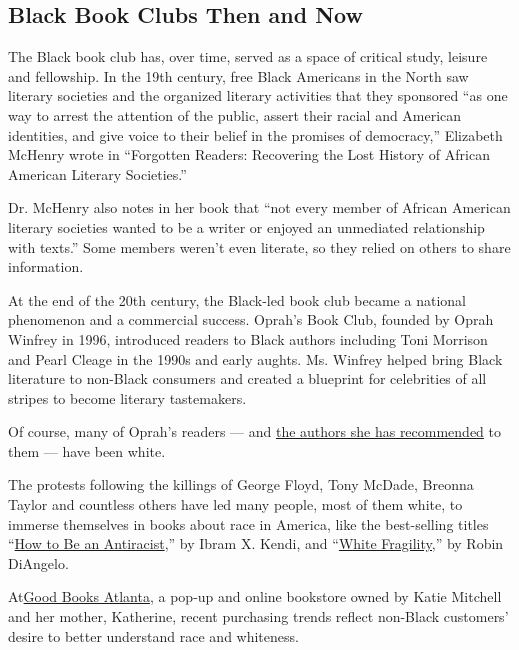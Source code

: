 \hypertarget{black-book-clubs-then-and-now}{%
\subsection{Black Book Clubs Then and
Now}\label{black-book-clubs-then-and-now}}

The Black book club has, over time, served as a space of critical study,
leisure and fellowship. In the 19th century, free Black Americans in the
North saw literary societies and the organized literary activities that
they sponsored ``as one way to arrest the attention of the public,
assert their racial and American identities, and give voice to their
belief in the promises of democracy,'' Elizabeth McHenry wrote in
``Forgotten Readers: Recovering the Lost History of African American
Literary Societies.''

Dr. McHenry also notes in her book that ``not every member of African
American literary societies wanted to be a writer or enjoyed an
unmediated relationship with texts.'' Some members weren't even
literate, so they relied on others to share information.

At the end of the 20th century, the Black-led book club became a
national phenomenon and a commercial success. Oprah's Book Club, founded
by Oprah Winfrey in 1996, introduced readers to Black authors including
Toni Morrison and Pearl Cleage in the 1990s and early aughts. Ms.
Winfrey helped bring Black literature to non-Black consumers and created
a blueprint for celebrities of all stripes to become literary
tastemakers.

Of course, many of Oprah's readers --- and
\href{https://www.oprahmag.com/entertainment/books/g23067476/oprah-book-club-list/}{the
authors she has recommended} to them --- have been white.

The protests following the killings of George Floyd, Tony McDade,
Breonna Taylor and countless others have led many people, most of them
white, to immerse themselves in books about race in America, like the
best-selling titles
``\href{https://bookshop.org/books/how-to-be-an-antiracist-9780593396803/9780593396803}{How
to Be an Antiracist},'' by Ibram X. Kendi, and
``\href{https://www.nytimes3xbfgragh.onion/2020/07/15/magazine/white-fragility-robin-diangelo.html}{White
Fragility,}'' by Robin DiAngelo.

At\href{https://www.goodbooksatl.com/}{Good Books Atlanta}, a pop-up and
online bookstore owned by Katie Mitchell and her mother, Katherine,
recent purchasing trends reflect non-Black customers' desire to better
understand race and whiteness.

